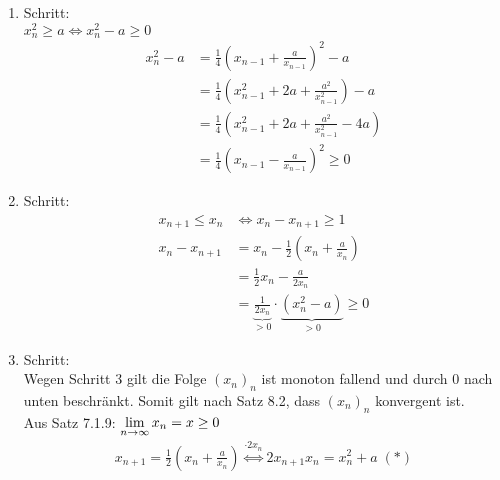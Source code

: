 \documentclass[../ana1u.tex]{subfiles}
\begin{document}
\begin{bsp}
\begin{bew}
\begin{enumerate}
                (IS): \(n \rightarrow n+1\): für beliebiges, aber festes n sei gezeigt, dass \(x_n > 0\)\\
                Dann gilt \(x_{n+1} = \frac{1}{2}(\underbrace{x_n}_{>0} + \underbrace{\frac{a}{x_n}}_{>0}) > 0\) wohldefiniert, weil \(x_n > 0\)\\
                Somit gilt nach dem Induktionsprinzip \(x_n > 0 \; \forall \, n \in \N\)
            \item Schritt:\\
                \(x_n^2 \geq a \Leftrightarrow x_n^2 - a \geq 0 \)
                \begin{align*}
                    x_n^2 - a &= \frac{1}{4}\left(x_{n-1} + \frac{a}{x_{n-1}}\right)^2 - a\\
                    &= \frac{1}{4}\left(x_{n-1}^2 + 2a + \frac{a^2}{x_{n-1}^2}\right) - a\\
                    &= \frac{1}{4}\left(x_{n-1}^2 + 2a + \frac{a^2}{x_{n-1}^2} - 4a\right)\\
                    &= \frac{1}{4}\left(x_{n-1} - \frac{a}{x_{n-1}}\right)^2 \geq 0
                \end{align*}
            \item Schritt:\\
                \begin{align*}
                    x_{n+1} \leq x_n &\Leftrightarrow x_n - x_{n+1} \geq 1\\
                    x_n - x_{n+1} &= x_n - \frac{1}{2}(x_n + \frac{a}{x_n})\\
                    &=\frac{1}{2}x_n - \frac{a}{2x_n}\\
                    &= \underbrace{\frac{1}{2x_n}}_{>0} \cdot \underbrace{(x_n^2 - a)}_{>0} \geq 0
                \end{align*}
            \item Schritt:\\
                Wegen Schritt 3 gilt die Folge \((x_n)_n\) ist monoton fallend und durch 0 nach unten beschränkt. Somit gilt nach Satz 8.2, dass \((x_n)_n\) konvergent ist.\\
                Aus Satz 7.1.9:
                \(\lim\limits_{n\rightarrow\infty} x_n = x \geq 0\)
                \begin{align*}
                    x_{n+1} = \frac{1}{2}(x_n + \frac{a}{x_n}) \overset{\cdot 2x_n} {\Leftrightarrow} 2x_{n+1}x_n = x_n^2 + a \;(\ast)\\						
                \end{align*}

\end{enumerate}
\end{bew}
\end{bsp}
\end{document}
